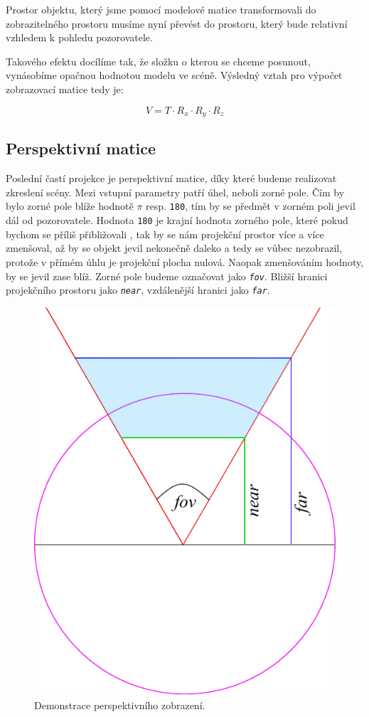 Prostor objektu, který jsme pomocí modelové matice transformovali do zobrazitelného prostoru musíme nyní převést do prostoru, který bude relativní vzhledem k pohledu pozorovatele.

Takového efektu docílíme tak, že složku o kterou se chceme posunout, vynásobíme opačnou hodnotou modelu ve scéně. Výsledný vztah pro výpočet zobrazovací matice tedy je:

$$ V = T \cdot R_{x} \cdot R_{y} \cdot R_{z} $$ 

\newpage


\subsection{Perspektivní matice}
Poslední častí projekce je perspektivní matice, díky které budeme realizovat zkreslení scény. Mezi vstupní parametry patří úhel, neboli zorné pole. Čím by bylo zorné pole blíže hodnotě $\pi$ resp. \texttt{180\degree}, tím by se předmět v zorném poli jevil dál od pozorovatele. Hodnota \texttt{180\degree} je krajní hodnota zorného pole, které pokud bychom se příliš přibližovali , tak by se nám projekční prostor více a více zmenšoval, až by se objekt jevil nekonečně daleko a tedy se vůbec nezobrazil, protože v přímém úhlu je projekční plocha nulová.  Naopak zmenšováním hodnoty, by se jevil zase blíž. Zorné pole budeme označovat jako \texttt{\textit{fov}}. Bližší hranici projekčního prostoru jako \texttt{\textit{near}}, vzdálenější hranici jako \texttt{\textit{far}}.



\begin{figure}[h]
	\label{img:perspective_matrix}
	\centering
	\includegraphics[scale=1.0,angle=0,width=0.5\linewidth]{obrazky-figures/perspective_matrix}
	\caption{Demonstrace perspektivního zobrazení.}
\end{figure}

